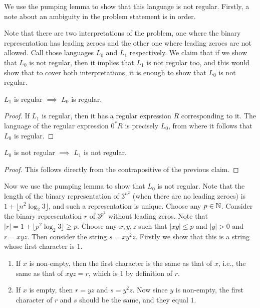 \begin{soln}
    We use the pumping lemma to show that this language is not regular. Firstly, a note about an ambiguity in the problem statement is in order.\nl

    \begin{note}
        Note that there are two interpretations of the problem, one where the binary representation has leading zeroes and the other one where leading zeroes are not allowed. Call those
        languages $L_0$ and $L_1$ respectively. We claim that if we show that $L_0$ is not regular, then it implies that $L_1$ is not regular too, and this would show that to cover both
        interpretations, it is enough to show that $L_0$ is not regular.
        \begin{claim}
            $L_1$ is regular $\implies$ $L_0$ is regular.
        \end{claim}
        \begin{proof}
            If $L_1$ is regular, then it has a regular expression $R$ corresponding to it. The language of the regular expression $0^* R$ is precisely $L_0$, from where it follows that $L_0$ is
            regular.
        \end{proof}
        \begin{claim}
            $L_0$ is not regular $\implies$ $L_1$ is not regular.
        \end{claim}
        \begin{proof}
            This follows directly from the contrapositive of the previous claim.
        \end{proof}
    \end{note}

    Now we use the pumping lemma to show that $L_0$ is not regular.\nl
    Note that the length of the binary representation of $3^{n^2}$ (when there are no leading zeroes) is $1 + \lfloor n^2 \log_2 3 \rfloor$, and such a representation is unique.\nl
    Choose any $p \in \mathbb{N}$. Consider the binary representation $r$ of $3^{p^2}$ without leading zeros. Note that $|r| = 1 + \lfloor p^2 \log_2 3 \rfloor \ge p$. Choose any $x, y, z$ such that $|xy| \le p$ and $|y| > 0$ and
    $r = xyz$. Then consider the string $s = xy^2z$.\nl
    Firstly we show that this is a string whose first character is $1$.
    \begin{enumerate}
        \item If $x$ is non-empty, then the first character is the same as that of $x$, i.e., the same as that of $xyz = r$, which is $1$ by definition of $r$.
        \item If $x$ is empty, then $r = yz$ and $s = y^2z$. Now since $y$ is non-empty, the first character of $r$ and $s$ should be the same, and they equal $1$.
    \end{enumerate}


\end{soln}
